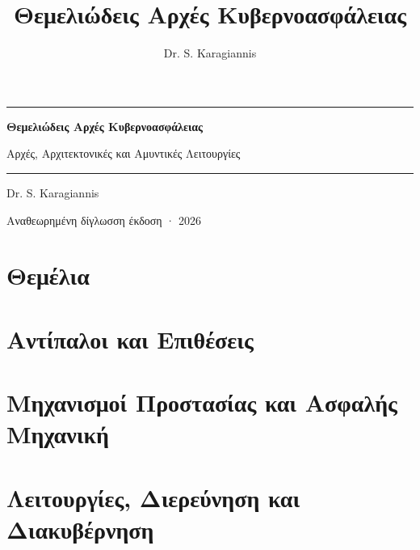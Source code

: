 \documentclass[11pt,openany]{book}
\title{Θεμελιώδεις Αρχές Κυβερνοασφάλειας}
\author{Dr. S. Karagiannis}
\begin{document}
\frontmatter
\begin{titlepage}
  \centering\sffamily
  \vspace*{3cm}
  {\color{accent}\rule{\linewidth}{1.2pt}}\par\vspace{1cm}
  {\Huge\bfseries Θεμελιώδεις Αρχές Κυβερνοασφάλειας\par}
  \vspace{0.6cm}
  {\Large Αρχές, Αρχιτεκτονικές και Αμυντικές Λειτουργίες\par}
  \vspace{1cm}
  {\color{accent}\rule{\linewidth}{1.2pt}}\par
  \vfill
  {\large Dr. S. Karagiannis\par}
  \vspace{0.3cm}
  {\small Αναθεωρημένη δίγλωσση έκδοση · 2026\par}
\end{titlepage}
\tableofcontents

\mainmatter
\part{Θεμέλια}


\part{Αντίπαλοι και Επιθέσεις}




\part{Μηχανισμοί Προστασίας και Ασφαλής Μηχανική}




\part{Λειτουργίες, Διερεύνηση και Διακυβέρνηση}



\end{document}
